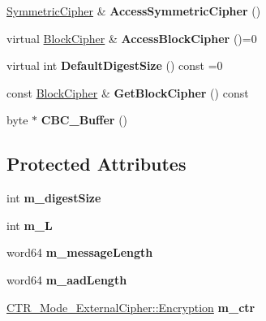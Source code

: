 \begin{DoxyCompactItemize}
\item 
\hypertarget{class_c_c_m___base_aab99d4a13dd4d90add451610d7e26470}{
\hyperlink{class_symmetric_cipher}{SymmetricCipher} \& {\bfseries AccessSymmetricCipher} ()}
\label{class_c_c_m___base_aab99d4a13dd4d90add451610d7e26470}

\item 
\hypertarget{class_c_c_m___base_a75e04110a11f9b50cf814d5577c2bce8}{
virtual \hyperlink{class_block_cipher}{BlockCipher} \& {\bfseries AccessBlockCipher} ()=0}
\label{class_c_c_m___base_a75e04110a11f9b50cf814d5577c2bce8}

\item 
\hypertarget{class_c_c_m___base_aefbb41916086b4ea845d99a03b46e7f3}{
virtual int {\bfseries DefaultDigestSize} () const =0}
\label{class_c_c_m___base_aefbb41916086b4ea845d99a03b46e7f3}

\item 
\hypertarget{class_c_c_m___base_ab5eb3fc9d432636c347a965b47d32bc0}{
const \hyperlink{class_block_cipher}{BlockCipher} \& {\bfseries GetBlockCipher} () const }
\label{class_c_c_m___base_ab5eb3fc9d432636c347a965b47d32bc0}

\item 
\hypertarget{class_c_c_m___base_aafaeeb40df73161e559ad6ff7eed705d}{
byte $\ast$ {\bfseries CBC\_\-Buffer} ()}
\label{class_c_c_m___base_aafaeeb40df73161e559ad6ff7eed705d}

\end{DoxyCompactItemize}
\subsection*{Protected Attributes}
\begin{DoxyCompactItemize}
\item 
\hypertarget{class_c_c_m___base_a5beda4b3c218a5db6ea38a8ebe174b4c}{
int {\bfseries m\_\-digestSize}}
\label{class_c_c_m___base_a5beda4b3c218a5db6ea38a8ebe174b4c}

\item 
\hypertarget{class_c_c_m___base_ac0b3c91d765d1ac3d3314f41cf0c4de6}{
int {\bfseries m\_\-L}}
\label{class_c_c_m___base_ac0b3c91d765d1ac3d3314f41cf0c4de6}

\item 
\hypertarget{class_c_c_m___base_ac416bb56c3a62827758c9c5157ae6512}{
word64 {\bfseries m\_\-messageLength}}
\label{class_c_c_m___base_ac416bb56c3a62827758c9c5157ae6512}

\item 
\hypertarget{class_c_c_m___base_a361a85c1050cb680548115ecb1788031}{
word64 {\bfseries m\_\-aadLength}}
\label{class_c_c_m___base_a361a85c1050cb680548115ecb1788031}

\item 
\hypertarget{class_c_c_m___base_a118f550fb64753e54f0234bbc809e9be}{
\hyperlink{class_cipher_mode_final_template___external_cipher}{CTR\_\-Mode\_\-ExternalCipher::Encryption} {\bfseries m\_\-ctr}}
\label{class_c_c_m___base_a118f550fb64753e54f0234bbc809e9be}

\end{DoxyCompactItemize}


